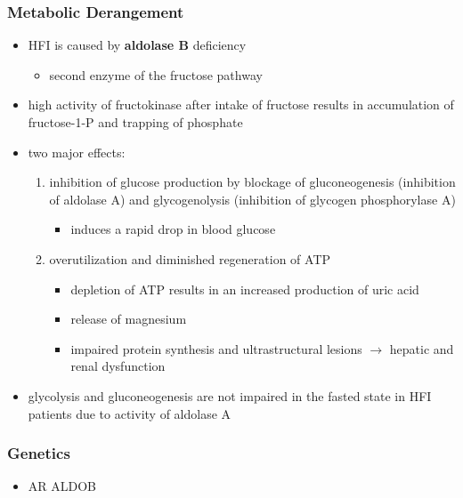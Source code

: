 \documentclass[12pt]{scrartcl}
\begin{document}
\subsubsection{Metabolic Derangement}
\label{sec:org9601c8c}
\begin{itemize}
\item HFI is caused by \textbf{aldolase B} deficiency
\begin{itemize}
\item second enzyme of the fructose pathway
\end{itemize}
\end{itemize}


\begin{itemize}
\item high activity of fructokinase after intake of fructose results in
accumulation of fructose-1-P and trapping of phosphate
\item two major effects:
\begin{enumerate}
\item inhibition of glucose production by blockage of gluconeogenesis
(inhibition of aldolase A) and glycogenolysis (inhibition of glycogen phosphorylase A)
\begin{itemize}
\item induces a rapid drop in blood glucose
\end{itemize}
\item overutilization and diminished regeneration of ATP
\begin{itemize}
\item depletion of ATP results in an increased production of uric acid
\item release of magnesium
\item impaired protein synthesis and ultrastructural lesions \(\to\)
hepatic and renal dysfunction
\end{itemize}
\end{enumerate}
\item glycolysis and gluconeogenesis are not impaired in the fasted state
in HFI patients due to activity of aldolase A
\end{itemize}

\subsubsection{Genetics}
\label{sec:org9c51017}
\begin{itemize}
\item AR ALDOB
\end{itemize}
\end{document}
